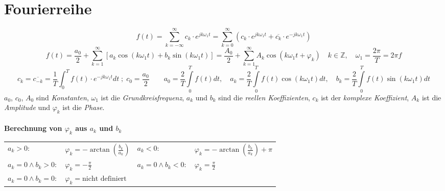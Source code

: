 \section{Fourierreihe}
  	$$\boxed{f(t) = \sum\limits_{k = -\infty}^{\infty} c_k \cdot e^{j k \omega_1
  	t}}= \boxed{\sum\limits_{k = 0}^{\infty} \left(c_k \cdot e^{j k \omega_1
  	t} + \overline{c_k} \cdot e^{-j k \omega_1t}\right)}$$
  	$$\boxed{f(t) = \frac{a_0}{2} + \sum\limits_{k=1}^{\infty} \left[a_k \cos(k
  	\omega_1 t) + b_k \sin(k \omega_1 t)\right]}=\boxed{\frac{A_0}{2} +
  	\sum\limits_{k=1}^{\infty} A_k \cos(k \omega_1 t + \varphi_k)} \quad k\in
  	\mathbb{Z}, \quad \boxed{\omega_1=\frac{2 \pi}{T}=2 \pi f}$$	
	$$\boxed{c_k=\overline{c_{-k}}=\frac{1}{T}\int_0^T{f(t)\cdot
	e^{-jk\omega_1
	t}dt} \; ; \; c_0 = \frac{a_0}{2}} \qquad \boxed{a_0 = \frac{2}{T}\int\limits_0^{T}
	f(t)dt, \quad a_k = \frac{2}{T}\int\limits_0^{T} f(t)\cos(k \omega_1 t) dt, \quad b_k =
	\frac{2}{T}\int\limits_0^{T} f(t)\sin(k \omega_1 t) dt}$$
	$a_0$, $c_0$, $A_0$ sind \textit{Konstanten}, $\omega_1$ ist die
	\textit{Grundkreisfrequenz}, $a_k$ und $b_k$ sind die \textit{reellen
	Koeffizienten}, $c_k$ ist der \textit{komplexe Koeffizient}, $A_k$ ist die
	\textit{Amplitude} und $\varphi_k$ ist die \textit{Phase}.\\
	\\

	\textbf{Berechnung von $\varphi_k$ aus $a_k$ und $b_k$}\\
	\begin{tabular}{p{4cm}p{4cm}p{3cm}p{3.5cm}}
		$a_k> 0:$ & $\varphi_k = -\arctan(\frac{b_k}{a_k})$ &
		$a_k<0:$ &	$\varphi_k = -\arctan(\frac{b_k}{a_k}) + \pi$\\
		$a_k = 0 \wedge b_k > 0:$ &	$\varphi_k = -\frac{\pi}{2}$ &
		$a_k = 0 \wedge b_k < 0:$ &	$\varphi_k = \frac{\pi}{2}$\\
		$a_k = 0 \wedge b_k = 0:$ &	$\varphi_k = \text{nicht definiert}$
	\end{tabular}

